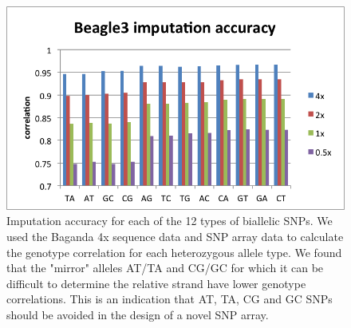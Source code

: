 \begin{figure}[htp]
\centering
\includegraphics{Chapter3/fig/imp_accu_allele}
\caption[Imputation accuracy for each of the 12 types of biallelic SNPs.]{Imputation accuracy for each of the 12 types of biallelic SNPs. We used the Baganda 4x sequence data and SNP array data to calculate the genotype correlation for each heterozygous allele type. We found that the "mirror" alleles AT/TA and CG/GC for which it can be difficult to determine the relative strand have lower genotype correlations. This is an indication that AT, TA, CG and GC \glspl{SNP} should be avoided in the design of a novel SNP array.}
\label{fig:imp_accu_allele}
\end{figure}